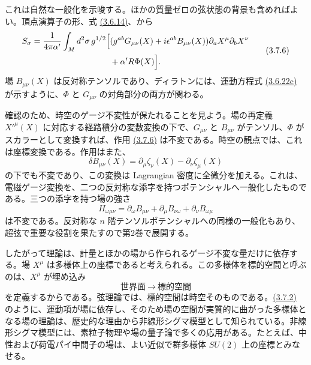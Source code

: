 これは自然な一般化を示唆する。ほかの質量ゼロの弦状態の背景も含めればよい。頂点演算子の形、式 \hyperref[eq:3.6.14]{(3.6.14)}、から
\begin{equation}
\begin{aligned}
S_\sigma=\frac1{4\pi\alpha'}\int_M d^2\sigma\,g^{1/2}
\Bigl[&(g^{ab}G_{\mu\nu}(X)+i\epsilon^{ab}B_{\mu\nu}(X))
\partial_aX^\mu\partial_bX^\nu\\
&+\alpha'R\Phi(X)\Bigr].
\end{aligned}
\tag{3.7.6}\label{eq:3.7.6}
\end{equation}
場 $B_{\mu\nu}(X)$ は反対称テンソルであり、ディラトンには、運動方程式 \hyperref[eq:3.6.22c]{(3.6.22c)} が示すように、$\Phi$ と $G_{\mu\nu}$ の対角部分の両方が関わる。

確認のため、時空のゲージ不変性が保たれることを見よう。場の再定義 $X'^\mu(X)$ に対応する経路積分の変数変換の下で、$G_{\mu\nu}$ と $B_{\mu\nu}$ がテンソル、$\Phi$ がスカラーとして変換すれば、作用 \hyperref[eq:3.7.6]{(3.7.6)} は不変である。時空の観点では、これは座標変換である。作用はまた、
\begin{equation}
\delta B_{\mu\nu}(X)=\partial_\mu\zeta_\nu(X)-\partial_\nu\zeta_\mu(X)
\tag{3.7.7}\label{eq:3.7.7}
\end{equation}
の下でも不変であり、この変換は Lagrangian 密度に全微分を加える。これは、電磁ゲージ変換を、二つの反対称な添字を持つポテンシャルへ一般化したものである。三つの添字を持つ場の強さ
\begin{equation}
H_{\omega\mu\nu}=
\partial_\omega B_{\mu\nu}+\partial_\mu B_{\nu\omega}
+\partial_\nu B_{\omega\mu}
\tag{3.7.8}\label{eq:3.7.8}
\end{equation}
は不変である。反対称な $n$ 階テンソルポテンシャルへの同様の一般化もあり、超弦で重要な役割を果たすので第2巻で展開する。

したがって理論は、計量とほかの場から作られるゲージ不変な量だけに依存する。場 $X^\mu$ は多様体上の座標であると考えられる。この多様体を標的空間と呼ぶのは、$X^\mu$ が埋め込み
\begin{equation}
\text{世界面}\ \longrightarrow\ \text{標的空間}
\tag{3.7.9}\label{eq:3.7.9}
\end{equation}
を定義するからである。弦理論では、標的空間は時空そのものである。\hyperref[eq:3.7.2]{(3.7.2)} のように、運動項が場に依存し、そのため場の空間が実質的に曲がった多様体となる場の理論は、歴史的な理由から非線形シグマ模型として知られている。非線形シグマ模型には、素粒子物理や場の量子論で多くの応用がある。たとえば、中性および荷電パイ中間子の場は、よい近似で群多様体 $SU(2)$ 上の座標とみなせる。

